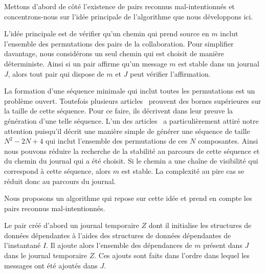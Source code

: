 Mettons d'abord de côté l'existence de pairs reconnus mal-intentionnés et concentrons-nous sur l'idée principale de l'algorithme que nous développons ici.



L'idée principale est de vérifier qu'un chemin qui prend source en $m$ inclut l'ensemble des permutations des pairs de la collaboration.
Pour simplifier davantage, nous considérons un seul chemin qui est choisit de manière déterministe.
Ainsi si un pair affirme qu'un message $m$ est stable dans un journal $J$, alors tout pair qui dispose de $m$ et $J$ peut vérifier l'affirmation.

La formation d'une séquence minimale qui inclut toutes les permutations est un problème ouvert.
Toutefois plusieurs articles~\autocite{engen2018_containing} prouvent des bornes supérieures sur la taille de cette séquence.
Pour ce faire, ils décrivent dans leur preuve la génération d'une telle séquence.
L'un des articles~\autocite{adleman_1974_shortperm} a particulièrement attiré notre attention puisqu'il décrit une manière simple de générer une séquence de taille $N^2 -2N +4$ qui inclut l'ensemble des permutations de ces $N$ composantes.
Ainsi nous pouvons réduire la recherche de la stabilité au parcours de cette séquence et du chemin du journal qui a été choisit.
Si le chemin a une chaîne de visibilité qui correspond à cette séquence, alors $m$ est stable.
La complexité au pire cas se réduit donc au parcours du journal.

Nous proposons un algorithme qui repose sur cette idée et prend en compte les pairs reconnus mal-intentionnés.

Le pair créé d'abord un journal temporaire $Z$ dont il initialise les structures de données dépendantes à l'aides des structures de données dépendantes de l'instantané $I$.
Il ajoute alors l'ensemble des dépendances de $m$ présent dans $J$ dans le journal temporaire $Z$.
Ces ajouts sont faits dans l'ordre dans lequel les messages ont été ajoutés dans $J$.

